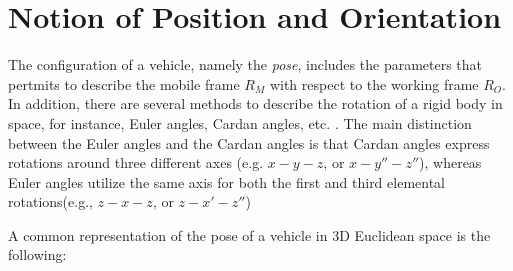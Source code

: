 \documentclass{thesisreport}
\begin{document}

\section{Notion of Position and Orientation}

The configuration of a vehicle, namely the \textit{pose}, includes the parameters that pertmits to describe the mobile frame $R_M$ with respect to the working frame $R_O$. In addition, there are several methods to describe the rotation of a rigid body in space, for instance, Euler angles, Cardan angles, etc. \cite{Goldstein1980}. The main distinction between the Euler angles and the Cardan angles is that Cardan angles express rotations around three different axes (e.g. $x-y-z$, or $x-y'' -z''$), whereas Euler angles utilize the same axis for both the first and third elemental rotations(e.g., $z-x-z$, or $z-x'-z''$)

A common representation of the pose of a vehicle in 3D Euclidean space is the following:
\end{document}
